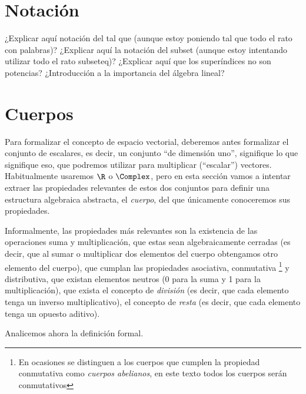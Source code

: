 \documentclass[../ecuaciones_diferenciales.tex]{subfiles}
\begin{document}
\section{Notación}

¿Explicar aquí notación del tal que (aunque estoy poniendo tal que todo el rato con palabras)? ¿Explicar aquí la notación del subset (aunque estoy intentando utilizar todo el rato subseteq)? ¿Explicar aquí que los superíndices no son potencias? ¿Introducción a la importancia del álgebra lineal?

\section{Cuerpos}

Para formalizar el concepto de espacio vectorial, deberemos antes formalizar el conjunto de escalares, es decir, un conjunto ``de dimensión uno'', signifique lo que signifique eso, que podremos utilizar para multiplicar (``escalar'') vectores. Habitualmente usaremos $\R$ o $\Complex$, pero en esta sección vamos a intentar extraer las propiedades relevantes de estos dos conjuntos para definir una estructura algebraica abstracta, el \textit{cuerpo}, del que únicamente conoceremos sus propiedades.

Informalmente, las propiedades más relevantes son la existencia de las operaciones suma y multiplicación, que estas sean algebraicamente cerradas
(es decir, que al sumar o multiplicar dos elementos del cuerpo obtengamos otro elemento del cuerpo), que cumplan las propiedades asociativa, conmutativa
\footnote{En ocasiones se distinguen a los cuerpos que cumplen la propiedad conmutativa como \textit{cuerpos abelianos}, en este texto todos los cuerpos
 serán conmutativos} y distributiva, que existan elementos neutros (0 para la suma y 1 para la multiplicación), que exista el concepto de \textit{división} (es decir, que cada elemento tenga un inverso multiplicativo), el concepto de \textit{resta} (es decir, que cada elemento tenga un opuesto aditivo).

Analicemos ahora la definición formal.
\end{document}
